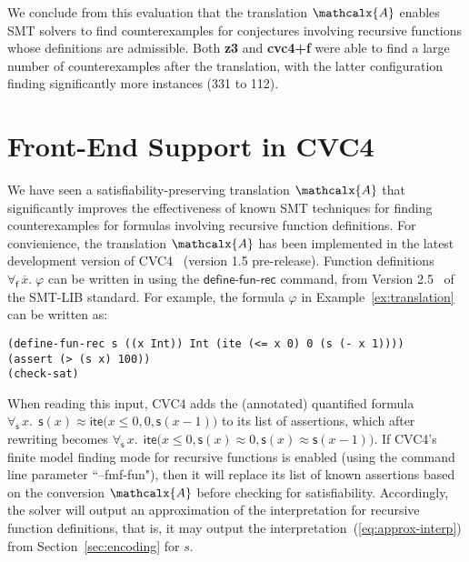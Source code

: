 \documentclass[runningheads,a4paper]{llncs}
\newcommand{\con}[1]{\mathsf{#1}}
\renewcommand\vec[1]{\overline{#1}}
\newcommand\cvc{CVC4\xspace}
\newcommand{\teq}{\approx}
\newcommand{\conv}{\mathcalx{A}}
\newcommand{\lite}{\con{ite}}
\newcommand{\forallf}[1]{\forall_{\!#1\:}}
\newcommand{\definefunreccmd}{\con{define}\text{-}\con{fun}\text{-}\con{rec}}
\begin{document}
We conclude from this evaluation that the translation $\conv$ enables SMT solvers to find counterexamples
for conjectures involving recursive functions whose definitions are admissible.
Both {\bf z3} and {\bf cvc4+f} were able to find a large number of counterexamples after the translation,
with the latter configuration finding significantly more instances (331 to 112).

\section{Front-End Support %
  in CVC4}
\label{sec:front-end}

We have seen a satisfiability-preserving translation $\conv$ that significantly improves the effectiveness of known SMT techniques
for finding counterexamples for formulas involving recursive function definitions.
For convienience, the translation $\conv$ has been implemented in the latest development version of \cvc~\cite{ReyEtAl-1-RR-13} (version 1.5 pre-release).
Function definitions $\forallf{\con{f}} \vec x.\; \varphi$ can be written in using the $\definefunreccmd$ command,
from Version 2.5~\cite{} of the SMT-LIB standard.
For example, the formula $\varphi$ in Example~\ref{ex:translation}
can be written as:

{\small
\begin{verbatim}
(define-fun-rec s ((x Int)) Int (ite (<= x 0) 0 (s (- x 1))))
(assert (> (s x) 100))
(check-sat)
\end{verbatim}
}

When reading this input,
\cvc adds the (annotated) quantified formula $\forallf{\con{s}} x.\;\, \con{s}( x ) \teq \lite\bigl( x \leq 0, 0, \con{s}( x-1 )\bigr)$ to its list of assertions,
which after rewriting becomes $\forallf{\con{s}} x.\;\, \lite\bigl( x \leq 0, \con{s}( x ) \teq 0, \con{s}( x ) \teq \con{s}( x-1 ) \bigr)$.
If \cvc's finite model finding mode for recursive functions is enabled (using the command line parameter ``--fmf-fun"),
then it will replace its list of known assertions based on the conversion $\conv$ before checking for satisfiability.
Accordingly, the solver will output an approximation of the interpretation for recursive function definitions,
that is, it may output the interpretation~(\ref{eq:approx-interp}) from Section~\ref{sec:encoding} for $s$.
\end{document}
